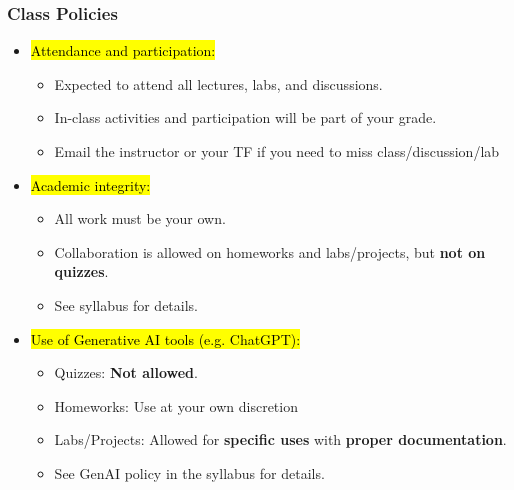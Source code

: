 \documentclass[slidestop,compress,mathserif]{beamer}
\begin{document}
\begin{frame}
	\frametitle{Class Policies} 
	\begin{itemize}
		\item \hl{Attendance and participation:} 
		\begin{itemize}
			\item Expected to attend all lectures, labs, and discussions. 
			\item In-class activities and participation will be part of your grade.
			\item Email the instructor or your TF if you need to miss class/discussion/lab
		\end{itemize}
		\item \hl{Academic integrity:} 
		\begin{itemize}
			\item All work must be your own. 
			\item Collaboration is allowed on homeworks and labs/projects, but \textbf{not on quizzes}. 
			\item See syllabus for details.
		\end{itemize}
		\item \hl{Use of Generative AI tools (e.g. ChatGPT):}
		\begin{itemize}
			\item Quizzes: \textbf{Not allowed}.
			\item Homeworks: Use at your own discretion
			\item Labs/Projects: Allowed for \textbf{specific uses} with \textbf{proper documentation}.
			\item See GenAI policy in the syllabus for details.
		\end{itemize}
	\end{itemize}
\end{frame}
\end{document}
